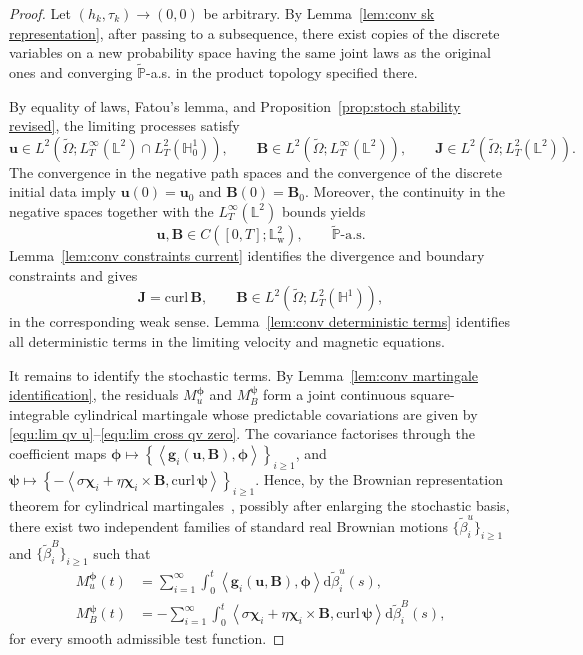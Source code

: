 \documentclass[11pt, reqno]{amsart}
\theoremstyle{definition}
\numberwithin{equation}{section}
\newcommand{\curl}{\mathrm{curl}\,}
\newcommand{\bff}{\boldsymbol}
\newcommand{\bb}{\mathbb}
\newcommand{\inpro}[2]{\left\langle#1,#2\right\rangle}
\begin{document}
\begin{proof}
	Let $(h_k,\tau_k)\to(0,0)$ be arbitrary. By
	Lemma~\ref{lem:conv sk representation}, after passing to a subsequence,
	there exist copies of the discrete variables on a new probability space
	having the same joint laws as the original ones and converging
	$\widetilde{\bb P}$-a.s. in the product topology specified there.
	
	By equality of laws, Fatou's lemma, and
	Proposition~\ref{prop:stoch stability revised}, the limiting processes
	satisfy
	\[
	\bff u\in L^2\left(\widetilde\Omega; L^\infty_T(\bb L^2)\cap L^2_T(\bb H_0^1) \right),
	\qquad
	\bff B\in L^2\left( \widetilde\Omega; L^\infty_T(\bb L^2) \right),
	\qquad
	\bff J\in L^2\left( \widetilde\Omega;L^2_T(\bb L^2) \right).
	\]
	The convergence in the negative path spaces and the convergence of the
	discrete initial data imply $\bff u(0)=\bff u_0$ and $\bff B(0)=\bff B_0$.
	Moreover, the continuity in the negative spaces together with the
	$L^\infty_T(\bb L^2)$ bounds yields
	\[
	\bff u,\bff B\in C([0,T];\bb L^2_{\mathrm w}),
	\qquad
	\widetilde{\bb P}\text{-a.s.}
	\]
	Lemma~\ref{lem:conv constraints current} identifies the divergence and
	boundary constraints and gives
	\[
	\bff J=\curl\bff B,
	\qquad
	\bff B\in
	L^2\left(
	\widetilde\Omega;
	L^2_T(\bb H^1)
	\right),
	\]
	in the corresponding weak sense. Lemma~\ref{lem:conv deterministic terms}
	identifies all deterministic terms in the limiting velocity and magnetic
	equations.
	
	It remains to identify the stochastic terms. By
	Lemma~\ref{lem:conv martingale identification}, the residuals
	$M_u^{\bff\phi}$ and $M_B^{\bff\psi}$ form a joint continuous
	square-integrable cylindrical martingale whose predictable covariations
	are given by \eqref{equ:lim qv u}--\eqref{equ:lim cross qv zero}. The covariance factorises through the coefficient maps $\bff\phi \mapsto \left\{\inpro{\bff g_i(\bff u,\bff B)}{\bff\phi}\right\}_{i\ge1}$,
	and $\bff\psi \mapsto \left\{-\inpro{\sigma\bff\chi_i+\eta\bff\chi_i\times\bff B}{\curl\bff\psi} \right\}_{i\ge1}$.
	Hence, by the Brownian representation theorem for cylindrical
	martingales~\cite{Ond05}, possibly after enlarging
	the stochastic basis, there exist two independent families of standard
	real Brownian motions $\{\widetilde\beta_i^u\}_{i\ge1}$ and $\{\widetilde\beta_i^B\}_{i\ge1}$ such that
	\begin{align}
		M_u^{\bff\phi}(t)
		&=
		\sum_{i=1}^{\infty}
		\int_0^t \inpro{\bff g_i(\bff u,\bff B)}{\bff\phi}
		\mathrm d\widetilde\beta_i^u(s),
		\label{equ:represented mart u}
		\\
		M_B^{\bff\psi}(t)
		&=
		-\sum_{i=1}^{\infty}
		\int_0^t \inpro{\sigma\bff\chi_i+\eta\bff\chi_i\times\bff B}
		{\curl\bff\psi} \mathrm d\widetilde\beta_i^B(s),
		\label{equ:represented mart B}
	\end{align}
	for every smooth admissible test function.
	

\end{proof}
\end{document}
